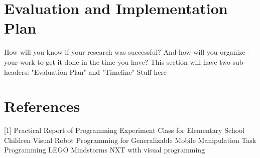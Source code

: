 \documentclass[12pt]{article}
\begin{document}
\section{Evaluation and Implementation Plan}
How will you know if your research was successful?  And how will you organize your work to get it done in the time you have?  This section will have two sub-headers: "Evaluation Plan" and "Timeline"
Stuff here



\section {References}
[1] Practical Report of Programming Experiment Class for Elementary School Children
\newline
[2] Visual Robot Programming for Generalizable Mobile Manipulation Task 
\newline
[3]  Programming LEGO Mindstorms NXT with visual programming
\newline
\end{document}
